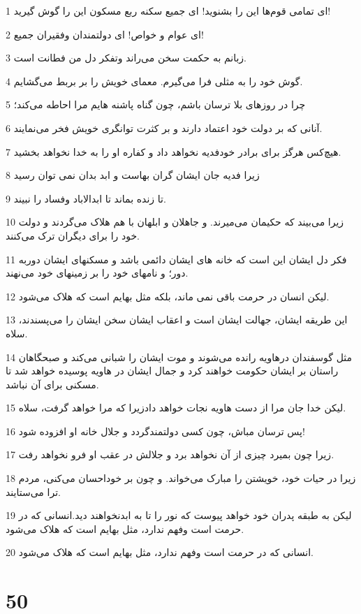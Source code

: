 \par 1 ای تمامی قوم‌ها این را بشنوید! ای جمیع سکنه ربع مسکون این را گوش گیرید!
\par 2 ‌ای عوام و خواص! ای دولتمندان وفقیران جمیع!
\par 3 زبانم به حکمت سخن می‌راند وتفکر دل من فطانت است.
\par 4 گوش خود را به مثلی فرا می‌گیرم. معمای خویش را بر بربط می‌گشایم.
\par 5 چرا در روزهای بلا ترسان باشم، چون گناه پاشنه هایم مرا احاطه می‌کند؛
\par 6 آنانی که بر دولت خود اعتماد دارند و بر کثرت توانگری خویش فخر می‌نمایند.
\par 7 هیچ‌کس هرگز برای برادر خودفدیه نخواهد داد و کفاره او را به خدا نخواهد بخشید.
\par 8 زیرا فدیه جان ایشان گران بهاست و ابد بدان نمی توان رسید
\par 9 تا زنده بماند تا ابدالاباد وفساد را نبیند.
\par 10 زیرا می‌بیند که حکیمان می‌میرند. و جاهلان و ابلهان با هم هلاک می‌گردند و دولت خود را برای دیگران ترک می‌کنند.
\par 11 فکر دل ایشان این است که خانه های ایشان دائمی باشد و مسکنهای ایشان دوربه دور؛ و نامهای خود را بر زمینهای خود می‌نهند.
\par 12 لیکن انسان در حرمت باقی نمی ماند، بلکه مثل بهایم است که هلاک می‌شود.
\par 13 این طریقه ایشان، جهالت ایشان است و اعقاب ایشان سخن ایشان را می‌پسندند، سلاه.
\par 14 مثل گوسفندان درهاویه رانده می‌شوند و موت ایشان را شبانی می‌کند و صبحگاهان راستان بر ایشان حکومت خواهند کرد و جمال ایشان در هاویه پوسیده خواهد شد تا مسکنی برای آن نباشد.
\par 15 لیکن خدا جان مرا از دست هاویه نجات خواهد دادزیرا که مرا خواهد گرفت، سلاه.
\par 16 پس ترسان مباش، چون کسی دولتمندگردد و جلال خانه او افزوده شود!
\par 17 زیرا چون بمیرد چیزی از آن نخواهد برد و جلالش در عقب او فرو نخواهد رفت.
\par 18 زیرا در حیات خود، خویشتن را مبارک می‌خواند. و چون بر خوداحسان می‌کنی، مردم ترا می‌ستایند.
\par 19 لیکن به طبقه پدران خود خواهد پیوست که نور را تا به ابدنخواهند دید.انسانی که در حرمت است وفهم ندارد، مثل بهایم است که هلاک می‌شود.
\par 20 انسانی که در حرمت است وفهم ندارد، مثل بهایم است که هلاک می‌شود.
 
\chapter{50}

